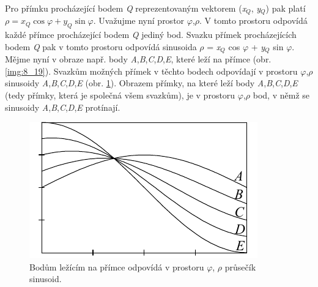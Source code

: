 Pro přímku procházející bodem \textit{Q} reprezentovaným vektorem (\textit{x}$_Q$, \textit{y}$_Q$) pak platí $\rho = x_Q \cos \varphi + y_Q \sin \varphi$. Uvažujme nyní prostor $\varphi$,$\rho$. V tomto prostoru odpovídá každé přímce procházející bodem \textit{Q} jediný bod. Svazku přímek procházejících bodem \textit{Q} pak v tomto prostoru odpovídá sinusoida $\rho$ = \textit{x}$_Q$ cos $\varphi$ + \textit{y}$_Q$ sin $\varphi$. Mějme nyní v obraze např. body \textit{A},\textit{B},\textit{C},\textit{D},\textit{E}, které leží na přímce (obr. \ref{img:8_19}). Svazkům možných přímek v těchto bodech odpovídají v prostoru $\varphi$,$\rho$ sinusoidy \textit{A},\textit{B},\textit{C},\textit{D},\textit{E} (obr. \ref{img:8_20}). Obrazem přímky, na které leží body \textit{A},\textit{B},\textit{C},\textit{D},\textit{E} (tedy přímky, která je společná všem svazkům), je v prostoru $\varphi$,$\rho$ bod, v němž se sinusoidy \textit{A},\textit{B},\textit{C},\textit{D},\textit{E} protínají.

\begin{figure}[th]
    \begin{center}
        \includegraphics[scale=0.9]{08_segmentace/images/img_8_20.pdf}
    \end{center}
    \caption{Bodům ležícím na přímce odpovídá v prostoru $\varphi$, $\rho$ průsečík sinusoid.}
    \label{img:8_20}
\end{figure}

